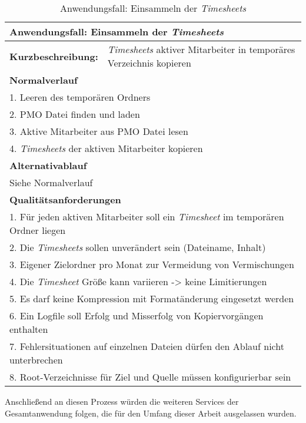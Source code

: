 \begin{table}[H]
    \begin{tabular}[H]{|l|l|}
        \hline
        \multicolumn{2}{|l|}{\textbf{Anwendungsfall:} Einsammeln der \textit{\glspl{Timesheet}}} \\
        \hline
        \textbf{Kurzbeschreibung:} & \textit{\glspl{Timesheet}} aktiver Mitarbeiter in temporäres Verzeichnis kopieren \\
        \hline
        \multicolumn{2}{|l|}{\textbf{Normalverlauf}} \\
        \hline
        \multicolumn{2}{|l|}{1. Leeren des temporären Ordners} \\
        \multicolumn{2}{|l|}{2. PMO Datei finden und laden} \\
        \multicolumn{2}{|l|}{3. Aktive Mitarbeiter aus PMO Datei lesen} \\
        \multicolumn{2}{|l|}{4. \textit{\glspl{Timesheet}} der aktiven Mitarbeiter kopieren} \\
        \hline
        \multicolumn{2}{|l|}{\textbf{Alternativablauf}} \\
        \hline
        \multicolumn{2}{|l|}{Siehe Normalverlauf} \\
        \multicolumn{2}{|l|}{\textbf{Qualitätsanforderungen}} \\
        \hline
        \multicolumn{2}{|l|}{1. Für jeden aktiven Mitarbeiter soll ein \textit{\gls{Timesheet}} im temporären Ordner liegen} \\
        \multicolumn{2}{|l|}{2. Die \textit{\glspl{Timesheet}} sollen unverändert sein (Dateiname, Inhalt)} \\
        \multicolumn{2}{|l|}{3. Eigener Zielordner pro Monat zur Vermeidung von Vermischungen} \\
        \multicolumn{2}{|l|}{4. Die \textit{\gls{Timesheet}} Größe kann variieren -> keine Limitierungen} \\
        \multicolumn{2}{|l|}{5. Es darf keine Kompression mit Formatänderung eingesetzt werden} \\
        \multicolumn{2}{|l|}{6. Ein Logfile soll Erfolg und Misserfolg von Kopiervorgängen enthalten} \\
        \multicolumn{2}{|l|}{7. Fehlersituationen auf einzelnen Dateien dürfen den Ablauf nicht unterbrechen} \\
        \multicolumn{2}{|l|}{8. Root-Verzeichnisse für Ziel und Quelle müssen konfigurierbar sein} \\
        \hline
    \end{tabular}
    \caption{Anwendungsfall: Einsammeln der \textit{\glspl{Timesheet}}}
    \label{tab:use-case-analyse-timesheets}
\end{table}

Anschließend an diesen Prozess würden die weiteren Services der Gesamtanwendung folgen, die für den Umfang dieser Arbeit ausgelassen wurden.